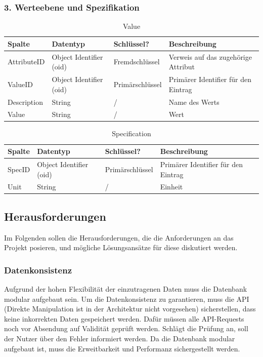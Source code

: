 \subsubsection{3. Werteebene und Spezifikation}
\begin{table}[H]
    \centering
    \caption{Value}
    \begin{tabularx}{\textwidth}{l l l X}
        \toprule
        \textbf{Spalte} & \textbf{Datentyp} & \textbf{Schlüssel?} & \textbf{Beschreibung} \\
        \midrule
        AttributeID & Object Identifier (oid) & Fremdschlüssel & Verweis auf das zugehörige Attribut\\
        ValueID & Object Identifier (oid) & Primärschlüssel & Primärer Identifier für den Eintrag\\
        Description & String & / & Name des Werts\\
        Value & String & / & Wert\\
        \bottomrule
    \end{tabularx}
    \label{tab:specification}
\end{table}

\begin{table}[H]
    \centering
    \caption{Specification}
    \begin{tabularx}{\textwidth}{l l l X}
        \toprule
        \textbf{Spalte} & \textbf{Datentyp} & \textbf{Schlüssel?} & \textbf{Beschreibung} \\
        \midrule
        SpecID & Object Identifier (oid) & Primärschlüssel & Primärer Identifier für den Eintrag\\
        Unit & String & / & Einheit\\
        \bottomrule
    \end{tabularx}
    \label{tab:formulation}
\end{table}

\subsection{Herausforderungen}
Im Folgenden sollen die Herausforderungen, die die Anforderungen an das Projekt posieren, und mögliche Lösungsansätze für diese diskutiert
werden. 
\subsubsection{Datenkonsistenz}
Aufgrund der hohen Flexibilität der einzutragenen Daten muss die Datenbank modular aufgebaut sein. Um die Datenkonsistenz zu garantieren, 
muss die API (Direkte Manipulation ist in der Architektur nicht vorgesehen) sicherstellen, dass keine inkorrekten Daten gespeichert werden. 
Dafür müssen alle API-Requests noch vor Absendung auf Validität geprüft werden. Schlägt die Prüfung an, soll der Nutzer über den 
Fehler informiert werden. Da die Datenbank modular aufgebaut ist, muss die Erweitbarkeit und Performanz sichergestellt werden.
